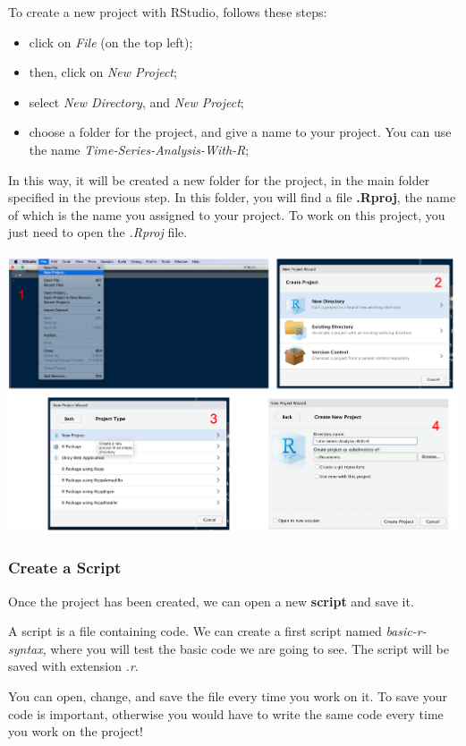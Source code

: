 \documentclass[
]{article}
\providecommand{\tightlist}{%
  \setlength{\itemsep}{0pt}\setlength{\parskip}{0pt}}
\begin{document}
To create a new project with RStudio, follows these steps:

\begin{itemize}
\tightlist
\item
  click on \emph{File} (on the top left);
\item
  then, click on \emph{New Project};
\item
  select \emph{New Directory}, and \emph{New Project};
\item
  choose a folder for the project, and give a name to your project. You can use the name \emph{Time-Series-Analysis-With-R};
\end{itemize}

In this way, it will be created a new folder for the project, in the main folder specified in the previous step. In this folder, you will find a file \textbf{.Rproj}, the name of which is the name you assigned to your project. To work on this project, you just need to open the \emph{.Rproj} file.

\includegraphics[width=33.57in]{images/r-studio-project-creation}

\hypertarget{create-a-script}{%
\subsubsection{Create a Script}\label{create-a-script}}

Once the project has been created, we can open a new \textbf{script} and save it.

A script is a file containing code. We can create a first script named \emph{basic-r-syntax}, where you will test the basic code we are going to see. The script will be saved with extension \emph{.r}.

You can open, change, and save the file every time you work on it.
To save your code is important, otherwise you would have to write the same code every time you work on the project!
\end{document}
